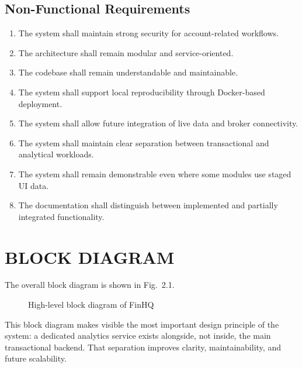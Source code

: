 \documentclass[12pt,a4paper]{report}
\newcommand{\projectshort}{FinHQ}
\begin{document}
\subsection{Non-Functional Requirements}
\begin{enumerate}[label=NFR\arabic*.]
\item The system shall maintain strong security for account-related workflows.
\item The architecture shall remain modular and service-oriented.
\item The codebase shall remain understandable and maintainable.
\item The system shall support local reproducibility through Docker-based deployment.
\item The system shall allow future integration of live data and broker connectivity.
\item The system shall maintain clear separation between transactional and analytical workloads.
\item The system shall remain demonstrable even where some modules use staged UI data.
\item The documentation shall distinguish between implemented and partially integrated functionality.
\end{enumerate}

\section{BLOCK DIAGRAM}
The overall block diagram is shown in Fig.~2.1.

\begin{figure}[H]
\centering
{}
\caption{High-level block diagram of \projectshort{}}
\end{figure}

This block diagram makes visible the most important design principle of the system: a dedicated analytics service exists alongside, not inside, the main transactional backend. That separation improves clarity, maintainability, and future scalability.
\end{document}
